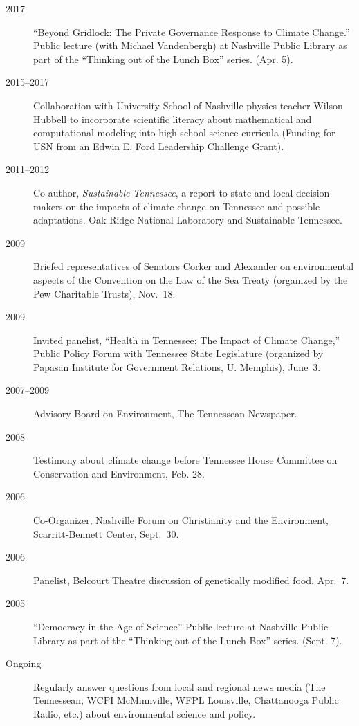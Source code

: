 \documentclass[10pt]{article}
\begin{document}
\begin{description}
            \item[2017] ``Beyond Gridlock: The Private Governance Response to Climate Change.'' Public lecture (with Michael Vandenbergh) at Nashville Public Library as part of the ``Thinking out of the Lunch Box'' series. (Apr. 5).
        	\item[2015--2017] Collaboration with University School of Nashville physics teacher Wilson Hubbell to incorporate scientific literacy about mathematical and computational modeling into high-school science curricula (Funding for USN from an Edwin E. Ford Leadership Challenge Grant).
    		\item[2011--2012] Co-author, \emph{Sustainable Tennessee}, a report to state and local decision makers on the impacts of climate change on Tennessee and possible adaptations. Oak Ridge National Laboratory and Sustainable Tennessee.
        	\item[2009] Briefed representatives of Senators Corker and Alexander on environmental aspects of the Convention on the Law of the Sea Treaty (organized by the Pew Charitable Trusts), Nov.~18.
        	\item[2009] Invited panelist, ``Health in Tennessee: The Impact of Climate Change,'' Public Policy Forum with Tennessee State Legislature (organized by Papasan Institute for Government Relations, U. Memphis), June~3.
        	\item[2007--2009] Advisory Board on Environment, The Tennessean Newspaper.
        	\item[2008] Testimony about climate change before Tennessee House Committee on Conservation and Environment, Feb. 28.
        	\item[2006] Co-Organizer, Nashville Forum on Christianity and the Environment, Scarritt-Bennett Center, Sept.~30.
        	\item[2006] Panelist, Belcourt Theatre discussion of genetically modified food. Apr.~7.
            \item[2005] ``Democracy in the Age of Science'' Public lecture at Nashville Public Library as part of the ``Thinking out of the Lunch Box'' series. (Sept. 7).
        	\item[Ongoing] Regularly answer questions from local and regional news media (The Tennessean, WCPI McMinnville, WFPL Louisville, Chattanooga Public Radio, etc.) about environmental science and policy.
        \end{description}
\end{document}
